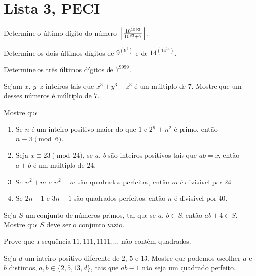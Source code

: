 \documentclass[10pt,a4paper]{article}
\begin{document}
	\newpage
	\section{Lista 3, PECI}

	\begin{prob}
		Determine o último dígito do número $\left\lfloor10^{1992}\over 10^{83}+7\right\rfloor$.
	\end{prob}

	\begin{prob}
		Determine os dois últimos dígitos de $9^{(9^{9})}$ e de $14^{(14^{14})}$.
	\end{prob}

	\begin{prob}
		Determine os três últimos dígitos de $7^{9999}$.
	\end{prob}

	\begin{prob}
		Sejam $x$, $y$, $z$ inteiros tais que $x^3+y^3-z^3$ é um múltiplo de $7$. Mostre que um desses números é múltiplo de $7$.
	\end{prob}

	\begin{prob}
		Mostre que
		\begin{enumerate}[label = (\alph*)]
			\item Se $n$ é um inteiro positivo maior do que $1$ e $2^n+n^2$ é primo, então $n\equiv3\pmod{6}$.
			\item Seja $x\equiv 23\pmod{24}$, se $a$, $b$ são inteiros positivos tais que $ab=x$, então $a+b$ é um múltiplo de $24$.
			\item Se $n^2+m$ e $n^2-m$ são quadrados perfeitos, então $m$ é divisível por $24$.
			\item Se $2n+1$ e $3n+1$ são quadrados perfeitos, então $n$ é divisível por $40$.  
		\end{enumerate}
	\end{prob}

	\begin{prob} Seja $S$ um conjunto de números primos, tal que se $a$, $b\in S$,
	então $ab+4\in S$.  Mostre que $S$ deve ser o conjunto vazio.
	\end{prob}

	\begin{prob} Prove que a sequência $11, 111, 1111, \ldots$ não contém
	quadrados.
	\end{prob}

	\begin{prob} Seja $d$ um inteiro positivo diferente de $2$, $5$ e $13$. Mostre
	que podemos escolher $a$ e $b$ distintos, $a, b\in \{2, 5, 13, d\}$,
	tais que $ab-1$ não seja um quadrado perfeito.
	\end{prob}
\end{document}
